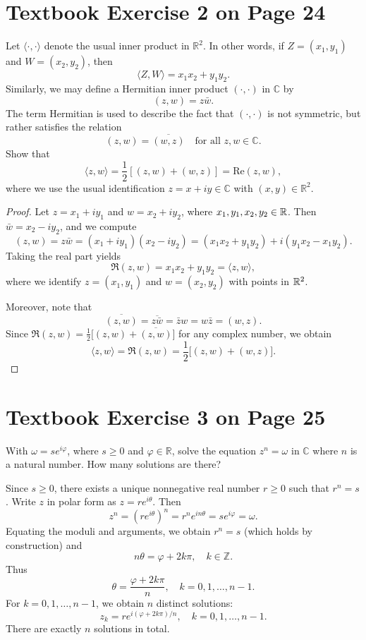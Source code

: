 \documentclass{article}
\newcommand{\name}{\getEnv{NAME}{NAME}}
\newcommand{\uid}{\getEnv{UID}{UID}}
\newcommand{\course}{Complex Analysis}
\newcommand{\hwNum}{1}
\begin{document}
\pagestyle{fancy}
\fancyhead{}
\lhead{\zhstr{\name} (\uid)}
\chead{\course\ \#\hwNum}
\rhead{\today}

\section{Textbook Exercise 2 on Page 24}

Let $\langle \cdot, \cdot \rangle$ denote the usual inner product in
$\mathbb{R}^2$. In other words, if $Z = (x_1, y_1)$ and $W = (x_2, y_2)$, then
\[
  \langle Z, W \rangle = x_1 x_2 + y_1 y_2.
\]
Similarly, we may define a Hermitian inner product $(\cdot, \cdot)$
in $\mathbb{C}$ by
\[
  (z, w) = z \bar{w}.
\]
The term Hermitian is used to describe the fact that $(\cdot, \cdot)$
is not symmetric, but rather satisfies the relation
\[
  (z, w) = \overline{(w, z)} \quad \text{for all } z, w \in \mathbb{C}.
\]
Show that
\[
  \langle z, w \rangle = \frac{1}{2} [(z, w) + (w, z)] = \text{Re}(z, w),
\]
where we use the usual identification $z = x + iy \in \mathbb{C}$
with $(x, y) \in \mathbb{R}^2$.

\begin{proof}
  Let $z = x_1 + i y_1$ and $w = x_2 + i y_2$, where $x_1, y_1, x_2,
  y_2 \in \mathbb{R}$.
  Then $\bar{w} = x_2 - i y_2$, and we compute
  \[
    (z, w) = z\bar{w} = (x_1 + i y_1)(x_2 - i y_2)
    = (x_1 x_2 + y_1 y_2) + i (y_1 x_2 - x_1 y_2).
  \]
  Taking the real part yields
  \[
    \Re(z, w) = x_1 x_2 + y_1 y_2 = \langle z, w \rangle,
  \]
  where we identify $z = (x_1, y_1)$ and $w = (x_2, y_2)$ with points in $\mathbb{R}^2$.

  Moreover, note that
  \[
    \overline{(z, w)} = \overline{z\bar{w}} = \bar{z}w = w\bar{z} = (w, z).
  \]
  Since $\Re(z, w) = \frac{1}{2}\big[(z, w) + \overline{(z, w)}\big]$
  for any complex number,
  we obtain
  \[
    \langle z, w \rangle = \Re(z, w)
    = \frac{1}{2}\big[(z, w) + (w, z)\big].
  \]
\end{proof}

\section{Textbook Exercise 3 on Page 25}

With $\omega = s e^{i\varphi}$, where $s \geq 0$ and $\varphi \in
\mathbb{R}$, solve the equation $z^n = \omega$ in $\mathbb{C}$ where
$n$ is a natural number. How many solutions are there?

\begin{solution}
  Since $s \ge 0$, there exists a unique nonnegative real number $r \ge 0$
  such that $r^n = s$. Write $z$ in polar form as $z = r e^{i\theta}$.
  Then
  \[
    z^n = (r e^{i\theta})^n = r^n e^{in\theta} = s e^{i\varphi} = \omega.
  \]
  Equating the moduli and arguments, we obtain $r^n = s$ (which holds by
  construction) and
  \[
    n\theta = \varphi + 2k\pi, \quad k \in \mathbb{Z}.
  \]
  Thus
  \[
    \theta = \frac{\varphi + 2k\pi}{n}, \quad k = 0, 1, \dots, n-1.
  \]
  For $k = 0, 1, \dots, n-1$, we obtain $n$ distinct solutions:
  \[
    z_k = r e^{i(\varphi + 2k\pi)/n}, \quad k = 0, 1, \dots, n-1.
  \]
  There are exactly $n$ solutions in total.
\end{solution}
\end{document}

